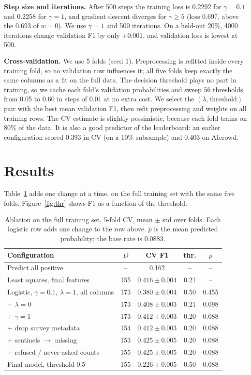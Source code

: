 \documentclass[10pt,conference]{IEEEtran}
\begin{document}
\textbf{Step size and iterations.} After 500 steps the training loss is 0.2292
for $\gamma=0.1$ and 0.2258 for $\gamma=1$, and gradient descent diverges for
$\gamma\ge 5$ (loss 0.697, above the 0.693 of $w=0$). We use $\gamma=1$ and 500
iterations. On a held-out 20\%, 4000 iterations change validation F1 by only
$+0.001$, and validation loss is lowest at 500.

\textbf{Cross-validation.} We use 5 folds (seed 1). Preprocessing is refitted
inside every training fold, so no validation row influences it; all five folds
keep exactly the same columns as a fit on the full data. The decision
threshold plays no part in training, so we cache each fold's validation
probabilities and sweep 56 thresholds from 0.05 to 0.60 in steps of 0.01 at no
extra cost. We select the $(\lambda,\text{threshold})$ pair with the best mean
validation F1, then refit preprocessing and weights on all training rows. The
CV estimate is slightly pessimistic, because each fold trains on 80\% of the
data. It is also a good predictor of the leaderboard: an earlier configuration
scored 0.393 in CV (on a 10\% subsample) and 0.403 on AIcrowd.

\section{Results}
Table~\ref{tab:ablation} adds one change at a time, on the full training set
with the same five folds. Figure~\ref{fig:thr} shows F1 as a function of the
threshold.

\begin{table}[t]
\centering
\caption{Ablation on the full training set, 5-fold CV, mean $\pm$ std over
folds. Each logistic row adds one change to the row above. $\bar p$ is the mean
predicted probability; the base rate is 0.0883.}
\label{tab:ablation}
\footnotesize
\setlength{\tabcolsep}{3pt}
\begin{tabular}{lcccc}
\toprule
Configuration & $D$ & CV F1 & thr. & $\bar p$ \\
\midrule
Predict all positive & -- & 0.162 & -- & -- \\
Least squares, final features & 155 & $0.416\pm0.004$ & 0.21 & -- \\
\midrule
Logistic, $\gamma{=}0.1$, $\lambda{=}1$, all columns & 173 & $0.380\pm0.004$ & 0.50 & 0.455 \\
+ $\lambda=0$ & 173 & $0.408\pm0.003$ & 0.21 & 0.098 \\
+ $\gamma=1$ & 173 & $0.412\pm0.003$ & 0.20 & 0.088 \\
+ drop survey metadata & 154 & $0.412\pm0.003$ & 0.20 & 0.088 \\
+ sentinels $\to$ missing & 153 & $0.425\pm0.005$ & 0.20 & 0.088 \\
+ refused / never-asked counts & 155 & $\mathbf{0.425\pm0.005}$ & 0.20 & 0.088 \\
\midrule
Final model, threshold 0.5 & 155 & $0.226\pm0.005$ & 0.50 & 0.088 \\
\bottomrule
\end{tabular}
\end{table}
\end{document}
